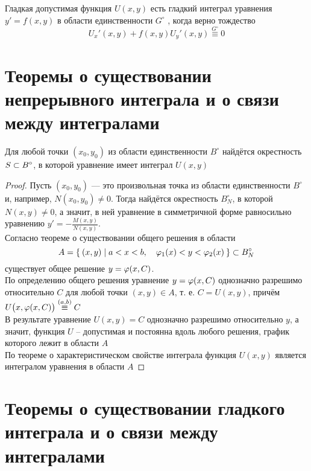 \begin{implication}
    Гладкая допустимая функция $ U(x, y) $ есть гладкий интеграл уравнения  $ y' = f(x, y) $ в области единственности $ G^\circ $ , когда верно тождество
    $$ U_x'(x, y) + f(x, y)U_y'(x, y) \overset{G^\circ}\equiv 0 $$
\end{implication}

\section{Теоремы о существовании непрерывного интеграла и о связи между интегралами}

\begin{theorem}
    Для любой точки $ (x_0, y_0) $ из области единственности $ B^\circ $ найдётся окрестность $ S \subset B^\circ $, в которой уравнение  имеет интеграл $ U(x, y) $
\end{theorem}

\begin{proof}
    Пусть $ (x_0, y_0) $ --- это произвольная точка из области единственности $ B^\circ $ и, например, $ N(x_0, y_0) \ne 0 $. Тогда найдётся окрестность $ B_N^\circ $, в которой $ N(x, y) \ne 0 $, а значит, в ней уравнение в симметричной форме  равносильно уравнению $ y' = - \frac{M(x, y)}{N(x, y)} $. \\
    Согласно теореме о существовании общего решения в области
    $$ A = \Set{(x,y) | a < x < b, \quad \varphi_1(x) < y < \varphi_2(x)} \subset B_N^\circ $$
    существует общее решение $ y = \varphi(x, C) $. \\
    По определению общего решения уравнение $ y = \varphi(x, C) $ однозначно разрешимо относительно $ C $ для любой точки $ (x, y) \in A $, т. е. $ C = U(x, y) $, причём $ U \big( x, \vphi(x, C) \big) \overset{(a, b)}\equiv C $ \\
    В результате уравнение $ U(x, y) = C $ однозначно разрешимо относительно $ y $, а значит, функция $ U $ -- допустимая и постоянна вдоль любого решения, график которого лежит в области $ A $ \\
    По теореме о характеристическом свойстве интеграла функция $ U(x, y) $ является интегралом уравнения  в области $ A $
\end{proof}


\section{Теоремы о существовании гладкого интеграла и о связи между интегралами}

